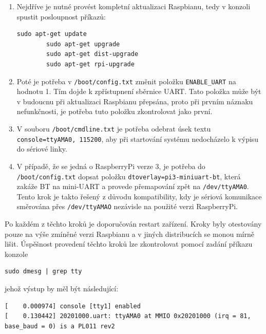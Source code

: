 \begin{enumerate}
	\item Nejdříve je nutné provést kompletní aktualizaci Raspbianu, tedy v konzoli spustit posloupnost příkazů:
	
	\begin{lstlisting}[style=MyCodeBash]
		sudo apt-get update
		sudo apt-get upgrade
		sudo apt-get dist-upgrade
		sudo apt-get rpi-upgrade	
	\end{lstlisting}
					
	\item Poté je potřeba v \texttt{/boot/config.txt} změnit položku \texttt{ENABLE\_UART} na hodnotu 1. Tím dojde k zpřístupnení sběrnice UART. Tato položka může být v budoucnu při aktualizaci Raspbianu přepsána, proto při prvním náznaku nefunkčnosti, je potřeba tuto položku zkontrolovat jako první.
	\item V souboru \texttt{/boot/cmdline.txt} je potřeba odebrat úsek textu \texttt{console=ttyAMA0, 115200}, aby při startování systému nedocházelo k výpisu do sériové linky. 
	\item V případě, že se jedná o RaspberryPi verze 3, je potřeba do \texttt{/boot/config.txt} dopsat položku \texttt{dtoverlay=pi3-miniuart-bt}, která zakáže BT na mini-UART a provede přemapování zpět na \texttt{/dev/ttyAMA0}. Tento krok je takto řešený z důvodu kompatibility, kdy je sériová komunikace směrována přes \texttt{/dev/ttyAMAO} nezávisle na použité verzi RaspberryPi.
\end{enumerate}

Po každém z těchto kroků je doporučován restart zařízení. Kroky byly otestovány pouze na výše zmíněné verzi Raspbianu a v jiných distribucích se monou mírně lišit. Úspěšnost provedení těchto kroků lze zkontrolovat pomocí zadání příkazu konzole 
	\begin{lstlisting}[style=MyCodeBash]
			sudo dmesg | grep tty
	\end{lstlisting}

jehož výstup by měl být následující:
					
	\begin{lstlisting}[style=MyCodeBash]
[    0.000974] console [tty1] enabled
[    0.130442] 20201000.uart: ttyAMA0 at MMIO 0x20201000 (irq = 81, base_baud = 0) is a PL011 rev2
	\end{lstlisting}
	\vspace{-20pt}



